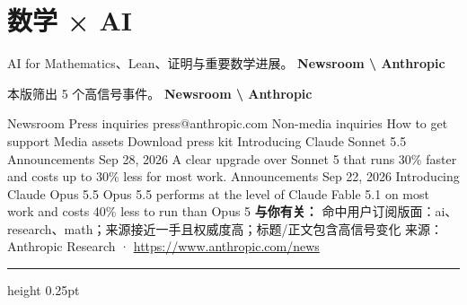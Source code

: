 \documentclass[10.5pt]{ctexart}
\begin{document}
\section*{数学 × AI}
{\color{ormuted} AI for Mathematics、Lean、证明与重要数学进展。}
\vspace{2mm}
{\LARGE\bfseries Newsroom \textbackslash{} Anthropic}\par
\vspace{1mm}
{\color{ormuted} 本版筛出 5 个高信号事件。}
\vspace{3mm}
{\Large\bfseries Newsroom \textbackslash{} Anthropic}\par
Newsroom Press inquiries press@anthropic.com Non-media inquiries How to get support Media assets Download press kit Introducing Claude Sonnet 5.5 Announcements Sep 28, 2026 A clear upgrade over Sonnet 5 that runs 30\% faster and costs up to 30\% less for most work. Announcements Sep 22, 2026 Introducing Claude Opus 5.5 Opus 5.5 performs at the level of Claude Fable 5.1 on most work and costs 40\% less to run than Opus 5
\textbf{与你有关：} 命中用户订阅版面：ai、research、math；来源接近一手且权威度高；标题/正文包含高信号变化
{\footnotesize\color{ormuted} 来源：Anthropic Research · \url{https://www.anthropic.com/news}}
\vspace{4mm}
\hrule height 0.25pt
\vspace{3mm}
\end{document}
